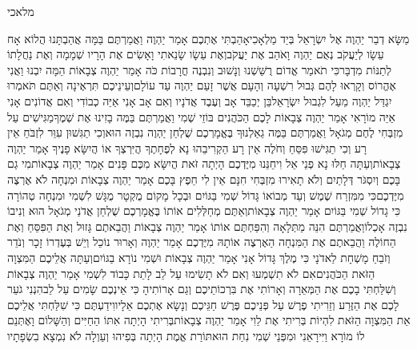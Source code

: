 \documentclass[../main/main.tex]{subfiles}
\begin{document}
\Incipit{}מלאכי\par
\vspace{\afterchapskip}
\RTLmulticolcolumns
\begin{multicols}{\ncols}
מַשָּׂא דְבַר יַהְוֶה אֶל יִשְׂרָאֵל בְּיַד מַלְאָכִי\PreVerseSpace{}אָהַבְתִּי אֶתְכֶם אָמַר יַהְוֶה וַאֲמַרְתֶּם בַּמָּה אֲהַבְתָּנוּ הֲלוֹא אָח עֵשָׂו לְיַעֲקֹב נְאֻם יַהְוֶה וָאֹהַב אֶת יַעֲקֹב\PreVerseSpace{}וְאֶת עֵשָׂו שָׂנֵאתִי וָאָשִׂים אֶת הָרָיו שְׁמָמָה וְאֶת נַחֲלָתוֹ לְתַנּוֹת מִדְבָּר\PreVerseSpace{}כִּי תֹאמַר אֱדוֹם רֻשַּׁשְׁנוּ וְנָשׁוּב וְנִבְנֶה חֳרָבוֹת כֹּה אָמַר יַהְוֶה צְבָאוֹת הֵמָּה יִבְנוּ וַאֲנִי אֶהֱרוֹס וְקָרְאוּ לָהֶם גְּבוּל רִשְׁעָה וְהָעָם אֲשֶׁר זָעַם יַהְוֶה עַד עוֹלָם\PreVerseSpace{}וְעֵינֵיכֶם תִּרְאֶינָה וְאַתֶּם תֹּאמְרוּ יִגְדַּל יַהְוֶה מֵעַל לִגְבוּל יִשְׂרָאֵל\PreVerseSpace{}בֵּן יְכַבֵּד אָב וְעֶבֶד אֲדֹנָיו וְאִם אָב אָנִי אַיֵּה כְבוֹדִי וְאִם אֲדוֹנִים אָנִי אַיֵּה מוֹרָאִי אָמַר יַהְוֶה צְבָאוֹת לָכֶם הַכֹּהֲנִים בּוֹזֵי שְׁמִי וַאֲמַרְתֶּם בַּמֶּה בָזִינוּ אֶת שְׁמֶךָ\PreVerseSpace{}מַגִּישִׁים עַל מִזְבְּחִי לֶחֶם מְגֹאָל וַאֲמַרְתֶּם בַּמֶּה גֵאַלְנוּךָ בֶּאֱמָרְכֶם שֻׁלְחַן יַהְוֶה נִבְזֶה הוּא\PreVerseSpace{}וְכִי תַגִּשׁוּן עִוֵּר לִזְבֹּחַ אֵין רָע וְכִי תַגִּישׁוּ פִּסֵּחַ וְחֹלֶה אֵין רָע הַקְרִיבֵהוּ נָא לְפֶחָתֶךָ הֲיִּרְצְךָ אוֹ הֲיִשָּׂא פָנֶיךָ אָמַר יַהְוֶה צְבָאוֹת\PreVerseSpace{}וְעַתָּה חַלּוּ נָא פְנֵי אֵל וִיחֵנֵּנוּ מִיֶּדְכֶם הָיְתָה זֹּאת הֲיִשָּׂא מִכֶּם פָּנִים אָמַר יַהְוֶה צְבָאוֹת\PreVerseSpace{}מִי גַם בָּכֶם וְיִסְגֹּר דְּלָתַיִם וְלֹא תָאִירוּ מִזְבְּחִי חִנָּם אֵין לִי חֵפֶץ בָּכֶם אָמַר יַהְוֶה צְבָאוֹת וּמִנְחָה לֹא אֶרְצֶה מִיֶּדְכֶם\PreVerseSpace{}כִּי מִמִּזְרַח שֶׁמֶשׁ וְעַד מְבוֹאוֹ גָּדוֹל שְׁמִי בַּגּוֹיִם וּבְכָל מָקוֹם מֻקְטָר מֻגָּשׁ לִשְׁמִי וּמִנְחָה טְהוֹרָה כִּי גָדוֹל שְׁמִי בַּגּוֹיִם אָמַר יַהְוֶה צְבָאוֹת\PreVerseSpace{}וְאַתֶּם מְחַלְּלִים אוֹתוֹ בֶּאֱמָרְכֶם שֻׁלְחַן אֲדֹנַי מְגֹאָל הוּא וְנִיבוֹ נִבְזֶה אָכְלוֹ\PreVerseSpace{}וַאֲמַרְתֶּם הִנֵּה מַתְּלָאָה וְהִפַּחְתֶּם אוֹתוֹ אָמַר יַהְוֶה צְבָאוֹת וַהֲבֵאתֶם גָּזוּל וְאֶת הַפִּסֵּחַ וְאֶת הַחוֹלֶה וַהֲבֵאתֶם אֶת הַמִּנְחָה הַאֶרְצֶה אוֹתָהּ מִיֶּדְכֶם אָמַר יַהְוֶה \ClosedSection{}וְאָרוּר נוֹכֵל וְיֵשׁ בְּעֶדְרוֹ זָכָר וְנֹדֵר וְזֹבֵחַ מָשְׁחָת לַאדֹנָי כִּי מֶלֶךְ גָּדוֹל אָנִי אָמַר יַהְוֶה צְבָאוֹת וּשְׁמִי נוֹרָא בַגּוֹיִם\PreChapterSpace{}וְעַתָּה אֲלֵיכֶם הַמִּצְוָה הַזֹּאת הַכֹּהֲנִים\PreVerseSpace{}אִם לֹא תִשְׁמְעוּ וְאִם לֹא תָשִׂימוּ עַל לֵב לָתֵת כָּבוֹד לִשְׁמִי אָמַר יַהְוֶה צְבָאוֹת וְשִׁלַּחְתִּי בָכֶם אֶת הַמְּאֵרָה וְאָרוֹתִי אֶת בִּרְכוֹתֵיכֶם וְגַם אָרוֹתִיהָ כִּי אֵינְכֶם שָׂמִים עַל לֵב\PreVerseSpace{}הִנְנִי גֹעֵר לָכֶם אֶת הַזֶּרַע וְזֵרִיתִי פֶרֶשׁ עַל פְּנֵיכֶם פֶּרֶשׁ חַגֵּיכֶם וְנָשָׂא אֶתְכֶם אֵלָיו\PreVerseSpace{}וִידַעְתֶּם כִּי שִׁלַּחְתִּי אֲלֵיכֶם אֵת הַמִּצְוָה הַזֹּאת לִהְיוֹת בְּרִיתִי אֶת לֵוִי אָמַר יַהְוֶה צְבָאוֹת\PreVerseSpace{}בְּרִיתִי הָיְתָה אִתּוֹ הַחַיִּים וְהַשָּׁלוֹם וָאֶתְּנֵם לוֹ מוֹרָא וַיִּירָאֵנִי וּמִפְּנֵי שְׁמִי נִחַת הוּא\PreVerseSpace{}תּוֹרַת אֱמֶת הָיְתָה בְּפִיהוּ וְעַוְלָה לֹא נִמְצָא בִשְׂפָתָיו 
\end{multicols}
\end{document}
